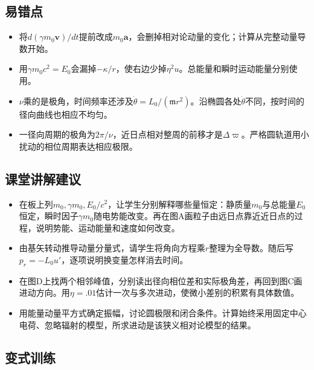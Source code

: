 \documentclass[UTF8,fontset=fandol,a4paper,11pt]{ctexart}
\begin{document}

\subsection*{易错点}

\begin{itemize}
\item 将$d(\gamma m_0\boldsymbol v)/dt$提前改成$m_0\boldsymbol a$，会删掉相对论动量的变化；计算从完整动量导数开始。
\item 用$\gamma m_0c^2=E_0$会漏掉$-\kappa/r$，使右边少掉$\eta^2u$。总能量和瞬时运动能量分别使用。
\item $\nu$乘的是极角，时间频率还涉及$\dot\theta=L_0/(\mathfrak m r^2)$。沿椭圆各处$\dot\theta$不同，按时间的径向曲线也相应不均匀。
\item 一径向周期的极角为$2\pi/\nu$，近日点相对整周的前移才是$\Delta\varpi$。严格圆轨道用小扰动的相位周期表达相应极限。
\end{itemize}



\subsection*{课堂讲解建议}

\begin{itemize}
\item 在板上列$m_0,\gamma m_0,E_0/c^2$，让学生分别解释哪些量恒定：静质量$m_0$与总能量$E_0$恒定，瞬时因子$\gamma m_0$随电势能改变。再在图A画粒子由远日点靠近近日点的过程，说明势能、运动能量和速度如何改变。
\item 由基矢转动推导动量分量式，请学生将角向方程乘$r$整理为全导数。随后写$p_r=-L_0u'$，逐项说明换变量怎样消去时间。
\item 在图D上找两个相邻峰值，分别读出径向相位差和实际极角差，再回到图C画进动方向。用$\eta=.01$估计一次与多次进动，使微小差别的积累有具体数值。
\item 用能量动量平方式确定振幅，讨论圆极限和闭合条件。计算始终采用固定中心电荷、忽略辐射的模型，所求进动是该狭义相对论模型的结果。
\end{itemize}



\subsection*{变式训练}
\end{document}
